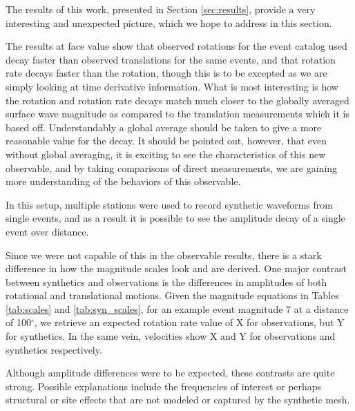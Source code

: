 \documentclass{gji}
\begin{document}
The results of this work, presented in Section \ref{sec:results}, provide a very interesting and unexpected picture, which we hope to address in this section.

 The results at face value show that observed rotations for the event catalog used decay faster than observed translations for the same events, and that rotation rate decays faster than the rotation, though this is to be excepted as we are simply looking at time derivative information. What is most interesting is how the rotation and rotation rate decays match much closer to the globally averaged surface wave magnitude as compared to the translation measurements which it is based off. Understandably a global average should be taken to give a more reasonable value for the decay. It should be pointed out, however, that even without global averaging, it is exciting to see the characteristics of this new observable, and by taking comparisons of direct measurements, we are gaining more understanding of the behaviors of this observable.

In this setup, multiple stations were used to record synthetic waveforms from single events, and as a result it is possible to see the amplitude decay of a single event over distance. 

Since we were not capable of this in the observable results, there is a stark difference in how the magnitude scales look and are derived. One major contrast between synthetics and observations is the differences in amplitudes of both rotational and translational motions. Given the magnitude equations in Tables \ref{tab:scales} and \ref{tab:syn_scales}, for an example event magnitude 7 at a distance of 100$^\circ$, we retrieve an expected rotation rate value of X for observations, but Y for synthetics. In the same vein, velocities show X and Y for observations and synthetics respectively.

Although amplitude differences were to be expected, these contrasts are quite strong. Possible explanations include the frequencies of interest or perhaps structural or site effects that are not modeled or captured by the synthetic mesh. %

\label{lastpage}
\end{document}

